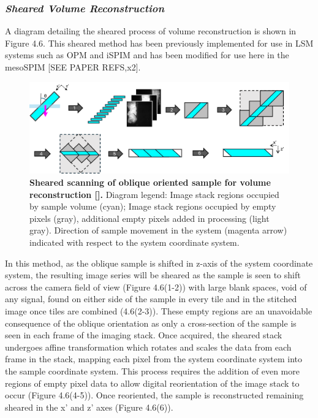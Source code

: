  
\subsubsection{\textit{Sheared Volume Reconstruction}}

A diagram detailing the sheared process of volume reconstruction is shown in Figure 4.6. This sheared method has been previously implemented for use in LSM systems such as OPM and iSPIM and has been modified for use here in the mesoSPIM [SEE PAPER REFS,x2]. 

\begin{figure}[H]
    \centering
    \includegraphics[width=1\linewidth]{Figures/shear.png}
    \medskip
    \caption{\textbf{Sheared scanning of oblique oriented sample for volume reconstruction [].} Diagram legend: Image stack regions occupied by sample volume (cyan); Image stack regions occupied by empty pixels (gray), additional empty pixels added in processing (light gray). Direction of sample movement in the system (magenta arrow) indicated with respect to the system coordinate system.}
    \label{fig:enter-label}
\end{figure}

In this method, as the oblique sample is shifted in z-axis of the system coordinate system, the resulting image series will be sheared as the sample is seen to shift across the camera field of view (Figure 4.6(1-2)) with large blank spaces, void of any signal, found on either side of the sample in every tile and in the stitched image once tiles are combined (4.6(2-3)). These empty regions are an unavoidable consequence of the oblique orientation as only a cross-section of the sample is seen in each frame of the imaging stack. Once acquired, the sheared stack undergoes affine transformation which rotates and scales the data from each frame in the stack, mapping each pixel from the system coordinate system into the sample coordinate system. This process requires the addition of even more regions of empty pixel data to allow digital reorientation of the image stack to occur (Figure 4.6(4-5)). Once reoriented, the sample is reconstructed remaining sheared in the x' and z' axes (Figure 4.6(6)).


